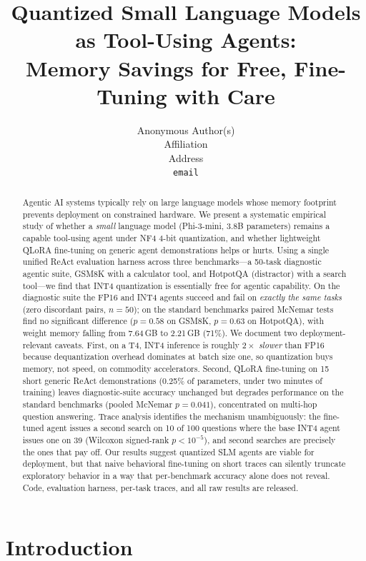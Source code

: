 \documentclass{article}
\title{Quantized Small Language Models as Tool-Using Agents:\\
Memory Savings for Free, Fine-Tuning with Care}
\author{%
  Anonymous Author(s)\\
  Affiliation\\
  Address\\
  \texttt{email}
}
\begin{document}
\maketitle

\begin{abstract}
Agentic AI systems typically rely on large language models whose memory
footprint prevents deployment on constrained hardware. We present a
systematic empirical study of whether a \emph{small} language model
(Phi-3-mini, 3.8B parameters) remains a capable tool-using agent under
NF4 4-bit quantization, and whether lightweight QLoRA fine-tuning on
generic agent demonstrations helps or hurts. Using a single unified ReAct
evaluation harness across three benchmarks---a 50-task diagnostic agentic
suite, GSM8K with a calculator tool, and HotpotQA (distractor) with a
search tool---we find that INT4 quantization is essentially free for
agentic capability. On the diagnostic suite the FP16 and INT4 agents
succeed and fail on \emph{exactly the same tasks} (zero discordant pairs,
$n{=}50$); on the standard benchmarks paired McNemar tests find no
significant difference ($p{=}0.58$ on GSM8K, $p{=}0.63$ on HotpotQA),
with weight memory falling from 7.64\,GB to 2.21\,GB (71\%). We document
two deployment-relevant caveats. First, on a T4, INT4 inference is
roughly $2\times$ \emph{slower} than FP16 because dequantization
overhead dominates at batch size one, so quantization buys memory, not
speed, on commodity accelerators. Second, QLoRA fine-tuning on 15 short
generic ReAct demonstrations (0.25\% of parameters, under two minutes of
training) leaves diagnostic-suite accuracy unchanged but degrades
performance on the standard benchmarks (pooled McNemar $p{=}0.041$),
concentrated on multi-hop question answering. Trace analysis identifies the
mechanism unambiguously: the fine-tuned agent issues a second search on 10
of 100 questions where the base INT4 agent issues one on 39 (Wilcoxon
signed-rank $p{<}10^{-5}$), and second searches are precisely the ones that
pay off. Our results
suggest quantized SLM agents are viable for deployment, but that naive
behavioral fine-tuning on short traces can silently truncate exploratory
behavior in a way that per-benchmark accuracy alone does not reveal.
Code, evaluation harness, per-task traces, and all raw results are
released.
\end{abstract}

\section{Introduction}
\label{sec:intro}
\end{document}
